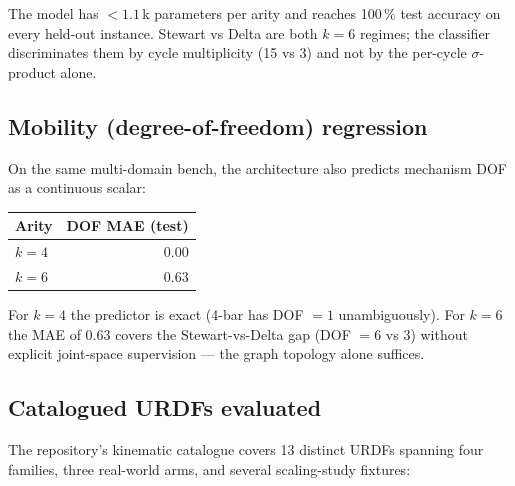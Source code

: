 \documentclass[11pt,a4paper]{article}
\newcommand{\sig}{\ensuremath{\sigma}}
\begin{document}
The model has $< 1.1$\,k parameters per arity and reaches 100\,\%
test accuracy on every held-out instance. Stewart vs Delta are both
$k = 6$ regimes; the classifier discriminates them by cycle
multiplicity (15 vs 3) and not by the per-cycle $\sig$-product
alone.

\subsection{Mobility (degree-of-freedom) regression}

On the same multi-domain bench, the architecture also predicts
mechanism DOF as a continuous scalar:

\begin{center}
\begin{tabular}{lr}
\toprule
Arity   & DOF MAE (test)    \\
\midrule
$k = 4$ & 0.00              \\
$k = 6$ & 0.63              \\
\bottomrule
\end{tabular}
\end{center}

For $k = 4$ the predictor is exact (4-bar has DOF $= 1$
unambiguously). For $k = 6$ the MAE of 0.63 covers the
Stewart-vs-Delta gap (DOF $= 6$ vs $3$) without explicit
joint-space supervision --- the graph topology alone suffices.

\subsection{Catalogued URDFs evaluated}

The repository's kinematic catalogue covers 13 distinct URDFs
spanning four families, three real-world arms, and several
scaling-study fixtures:
\end{document}
